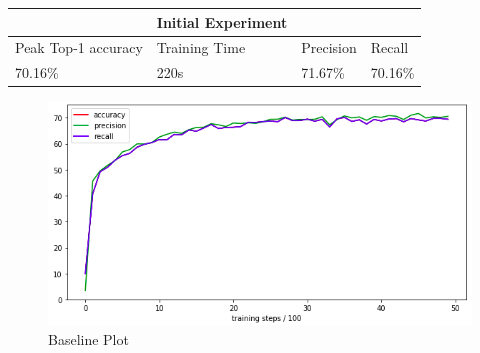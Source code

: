 \documentclass[12pt]{report}
\begin{document}
\vspace{0.5cm}
\begin{tabular}{llll}
                                          & Initial Experiment                 &                                &                              \\ \hline
\multicolumn{1}{|l|}{Peak Top-1 accuracy} & \multicolumn{1}{l|}{Training Time} & \multicolumn{1}{l|}{Precision} & \multicolumn{1}{l|}{Recall}  \\ \hline
\multicolumn{1}{|l|}{70.16\%}             & \multicolumn{1}{l|}{220s}          & \multicolumn{1}{l|}{71.67\%}   & \multicolumn{1}{l|}{70.16\%} \\ \hline
\end{tabular}

\vspace{0.5cm}
\begin{figure}[h]
	\centering
	\includegraphics[width=12cm]{baseline-graph}
	\caption{Baseline Plot}
	\label{fig:baseline}
\end{figure}
\end{document}
